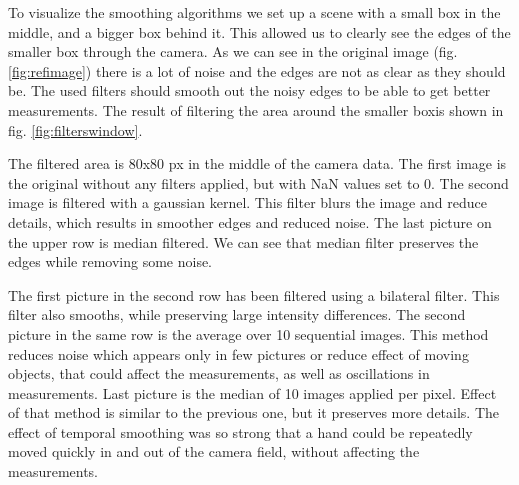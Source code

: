 \documentclass[11pt]{article}
\begin{document}
To visualize the smoothing algorithms we set up a scene with a small box in the
middle, and a bigger box behind it. This allowed us to clearly see the edges of
the smaller box through the camera. As we can see in the original image
(fig. \vref{fig:refimage}) there is a lot of noise and the edges are not as
clear as they should be. The used filters should smooth out the noisy edges to be able
to get better measurements. The result of filtering the area around the smaller boxis shown in fig. \vref{fig:filterswindow}. \par

The filtered area is 80x80 px in the middle of the camera data. The first image
is the original without any filters applied, but with NaN values set to 0. The
second image is filtered with a gaussian kernel. This filter blurs the image and
reduce details, which results in smoother edges and reduced noise. The last
picture on the upper row is median filtered. We can see that median filter
preserves the edges while removing some noise. \par

The first picture in the second row has been filtered using a bilateral
filter. This filter also smooths, while preserving large intensity
differences. The second picture in the same row is the average over 10
sequential images. This method reduces noise which appears only in few pictures
or reduce effect of moving objects, that could affect the measurements, as well
as oscillations in measurements. Last picture is the median of 10 images applied
per pixel. Effect of that method is similar to the previous one, but it
preserves more details. The effect of temporal smoothing was so strong that a
hand could be repeatedly moved quickly in and out of the camera field, without affecting
the measurements.
\end{document}

